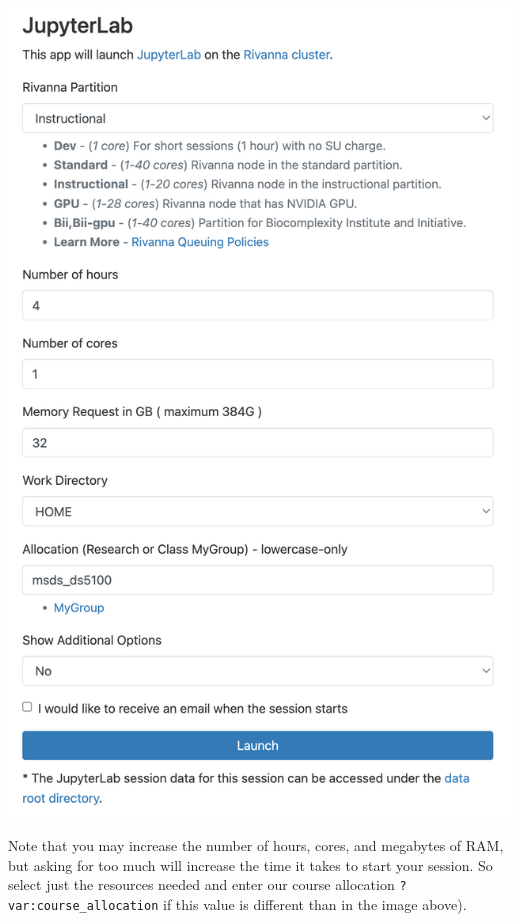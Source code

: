 \documentclass[
  letterpaper,
  DIV=11,
  numbers=noendperiod]{scrreprt}
\begin{document}
\includegraphics{modules/M02_BasicPython/../../media/jupyter-on-rivanna-form.png}

\begin{tcolorbox}[enhanced jigsaw, toprule=.15mm, opacityback=0, opacitybacktitle=0.6, colback=white, breakable, title=\textcolor{quarto-callout-tip-color}{\faLightbulb}\hspace{0.5em}{Tip}, toptitle=1mm, left=2mm, titlerule=0mm, bottomtitle=1mm, rightrule=.15mm, coltitle=black, colbacktitle=quarto-callout-tip-color!10!white, colframe=quarto-callout-tip-color-frame, arc=.35mm, bottomrule=.15mm, leftrule=.75mm]

Note that you may increase the number of hours, cores, and megabytes of
RAM, but asking for too much will increase the time it takes to start
your session. So select just the resources needed and enter our course
allocation \texttt{?var:course\_allocation} if this value is different
than in the image above).

\end{tcolorbox}
\end{document}
